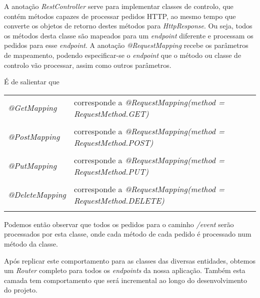 A anotação \emph{RestController} serve para implementar classes de controlo, que contém métodos capazes de processar pedidos HTTP, ao mesmo tempo que converte os objetos de retorno destes métodos para \emph{HttpResponse}.
Ou seja, todos os métodos desta classe são mapeados para um \emph{endpoint} diferente e processam os pedidos para esse \emph{endpoint}.
A anotação \emph{@RequestMapping} recebe os parâmetros de mapeamento, podendo especificar-se o \emph{endpoint} que o método ou classe de controlo vão processar, assim como outros parâmetros. 

É de salientar que\\
\begin{tabular}{ll}\\
	\emph{@GetMapping} & corresponde a \emph{@RequestMapping(method = RequestMethod.GET)}\\
	\\
	\emph{@PostMapping} & corresponde a \emph{@RequestMapping(method = RequestMethod.POST)}\\
	\\
	\emph{@PutMapping} & corresponde a \emph{@RequestMapping(method = RequestMethod.PUT)}\\
	\\
	\emph{@DeleteMapping} & corresponde a \emph{@RequestMapping(method = RequestMethod.DELETE)}\\
	\\
\end{tabular}

Podemos então observar que todos os pedidos para o caminho \emph{/event} serão processados por esta classe, onde cada método de cada pedido é processado num método da classe.

Após replicar este comportamento para as classes das diversas entidades, obtemos um \emph{Router} completo para todos os \emph{endpoints} da nossa aplicação. Também esta camada tem comportamento que será incremental ao longo do desenvolvimento do projeto.
